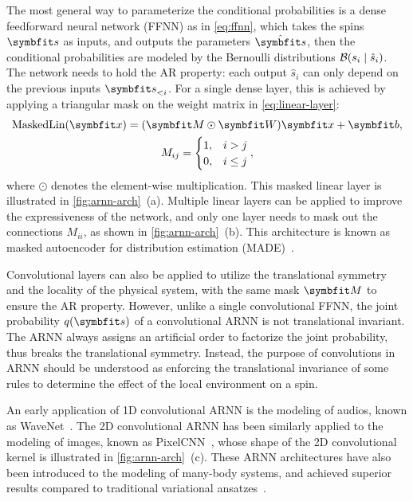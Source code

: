 The most general way to parameterize the conditional probabilities is a dense feedforward neural network (FFNN) as in \cref{eq:ffnn}, which takes the spins $\vs$ as inputs, and outputs the parameters $\hat{\vs}$, then the conditional probabilities are modeled by the Bernoulli distributions $\mathcal{B}(s_i \mid \hat{s}_i)$. The network needs to hold the AR property: each output $\hat{s}_i$ can only depend on the previous inputs $\vs_{< i}$. For a single dense layer, this is achieved by applying a triangular mask on the weight matrix in \cref{eq:linear-layer}:
\begin{gather}
\text{MaskedLin}(\vx) = (\mM \odot \mW) \vx + \mb, \\
M_{i j} = \begin{cases}
1, & i > j \\
0, & i \le j
\end{cases},
\end{gather}
where $\odot$ denotes the element-wise multiplication. This masked linear layer is illustrated in \cref{fig:arnn-arch}~(a). Multiple linear layers can be applied to improve the expressiveness of the network, and only one layer needs to mask out the connections $M_{i i}$, as shown in \cref{fig:arnn-arch}~(b). This architecture is known as masked autoencoder for distribution estimation (MADE)~\cite{germain2015made}.

Convolutional layers can also be applied to utilize the translational symmetry and the locality of the physical system, with the same mask $\mM$ to ensure the AR property. However, unlike a single convolutional FFNN, the joint probability $q(\vs)$ of a convolutional ARNN is not translational invariant. The ARNN always assigns an artificial order to factorize the joint probability, thus breaks the translational symmetry. Instead, the purpose of convolutions in ARNN should be understood as enforcing the translational invariance of some rules to determine the effect of the local environment on a spin.

An early application of 1D convolutional ARNN is the modeling of audios, known as WaveNet~\cite{oord2016wavenet}. The 2D convolutional ARNN has been similarly applied to the modeling of images, known as PixelCNN~\cite{oord2016pixel}, whose shape of the 2D convolutional kernel is illustrated in \cref{fig:arnn-arch}~(c). These ARNN architectures have also been introduced to the modeling of many-body systems, and achieved superior results compared to traditional variational ansatzes~\cite{wu2019solving}.

